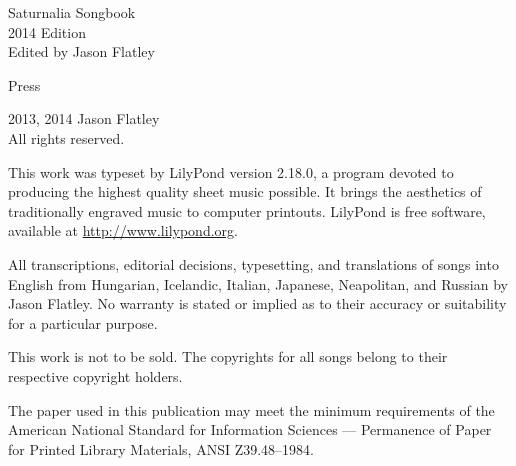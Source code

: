 \documentclass{memoir}
\newlength{\drop}
\newcommand*{\titleSW}{\begingroup%
\raggedleft
\vspace*{\baselineskip}
{\Huge Saturnalia Songbook}\\[\baselineskip]
{\large 2014 Edition}\\[0.2\textheight]
{\Large Edited by Jason Flatley}\par
\vfill
{\large \jlogo {} Press}
\vspace*{\baselineskip}
\endgroup}
\newcommand*{\thistitle}{\begingroup%
\parindent=0pt
\drop = 0.08\textheight
\vspace*{\drop}
\hspace*{0.3\textwidth}%
{\LARGE Peter Wilson}\\[2\drop]
\hspace*{0.3\textwidth}{\HUGE\itshape Some Examples of}\par
{\raggedleft\HUGE\itshape Title Pages\par}
\vfill
\settowidth{\bibindent}{\Large The Herries Press}%
\settowidth{\unitlength}{\Large 2006}%
\addtolength{\bibindent}{-\unitlength}%
\hspace*{0.3\textwidth}{\Large The Herries Press}\\[0.5\baselineskip]
\hspace*{0.3\textwidth}%
{\Large 2010}
\vspace*{\drop}
\endgroup}
\begin{document}
\raggedbottom






\frontmatter

\pagestyle{empty}
\newpage
\mbox{}
\clearpage


\pagestyle{empty}
\titleSW



\pagestyle{empty}
\clearpage
{}\selectfont
\begingroup
\footnotesize
\parindent 0pt
\parskip \baselineskip
\textcopyright{} 2013, 2014 Jason Flatley \\
All rights reserved.

    This work was typeset by LilyPond version 2.18.0, a program devoted
to producing the highest quality sheet music possible.  It brings the aesthetics of traditionally
engraved music to computer printouts.  LilyPond is free software, available at \url{http://www.lilypond.org}.

    All transcriptions, editorial decisions, typesetting, and translations of songs into English from Hungarian, Icelandic, Italian, 
Japanese, Neapolitan, and Russian by Jason Flatley.  No warranty is stated or implied as to their
accuracy or suitability for a particular purpose.  

    This work is not to be sold.  The copyrights for all songs belong to their respective copyright holders.

\begin{comment}
This material may be distributed only subject to the terms and conditions
set forth in the Open Publication License v1.0 or later (the latest
version is presently available at \url{http://www.opencontent.org/openpub/}).
Distribution of substantively modified versions of this document is
prohibited without the explicit permission of the copyright holder.
Distribution of the work or derivative of the work in any standard
(paper) book form is prohibited unless prior permission is obtained
from the copyright holder.


The procedures and applications presented in this work have been
included for their instructional value. They have been tested 
with care but are not guaranteed for any particular purpose.
The publisher does not offer any warranties or representations,
nor does it accept any liabilities with respect to the 
programs or applications.
\end{comment}

The paper used in this publication may meet the minimum 
requirements of the American National Standard for 
Information Sciences --- Permanence of Paper for Printed
Library Materials, ANSI Z39.48--1984.
\end{document}

